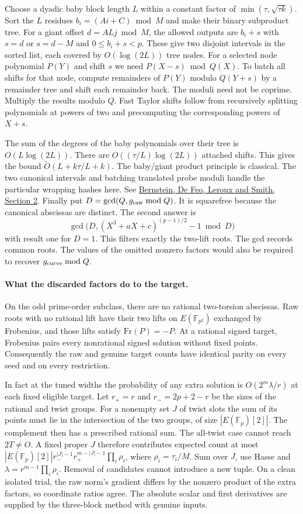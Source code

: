 \documentclass[11pt]{article}
\newcommand{\F}{\mathbb F}
\newcommand{\wtO}{\widetilde O}
\begin{document}
Choose a dyadic baby block length $L$ within a constant factor of
$\min(\tau,\sqrt{\tau k})$. Sort the $L$ residues
$b_i=(Ai+C)\bmod M$ and make their binary subproduct tree. For a
giant offset $d=ALj\bmod M$, the allowed outputs are $b_i+s$
with $s=d$ or $s=d-M$ and $0\le b_i+s<p$. These give two disjoint
intervals in the sorted list, each covered by $O(\log(2L))$ tree
nodes. For a selected node polynomial $P(Y)$ and shift $s$ we need
$P(X-s)\bmod Q(X)$. To batch all shifts for that node, compute
remainders of $P(Y)$ modulo $Q(Y+s)$ by a remainder tree and shift
each remainder back. The moduli need not be coprime. Multiply the
results modulo $Q$. Fast Taylor shifts follow from recursively
splitting polynomials at powers of two and precomputing the
corresponding powers of $X+s$.

The sum of the degrees of the baby polynomials over their tree is
$O(L\log(2L))$. There are $O((\tau/L)\log(2L))$ attached shifts.
This gives the bound $\wtO(L+k\tau/L+k)$. The baby/giant product
principle is classical. The two canonical intervals and batching
translated probe moduli handle the particular wrapping hashes here.
See \href{https://velusqrt.isogeny.org/velusqrt-20200616.pdf}
{Bernstein, De Feo, Leroux and Smith, Section 2}.
Finally put $D=\gcd(Q,g_{\rm raw}\bmod Q)$. It is squarefree
because the canonical abscissas are distinct. The second answer is
\[
  \gcd\big(D,(X^3+aX+c)^{(p-1)/2}-1\bmod D\big)
\]
with result one for $D=1$. This filters exactly the two-lift roots.
The gcd records common roots. The values of the omitted nonzero
factors would also be required to recover $g_{\rm curve}\bmod Q$.

\paragraph{What the discarded factors do to the target.}
On the odd prime-order subclass, there are no rational two-torsion
abscissas. Raw roots with no rational lift have their two lifts on
$E(\F_{p^2})$ exchanged by Frobenius, and those lifts satisfy
$\mathrm{Fr}(P)=-P$. At a rational signed target, Frobenius pairs
every nonrational signed solution without fixed points.
Consequently the raw and genuine target counts have identical
parity on every seed and on every restriction.

In fact at the tuned widths the probability of any extra solution
is $O(2^m\lambda/r)$ at each fixed eligible target.
Let $r_+=r$ and $r_-=2p+2-r$ be the sizes of the rational and
twist groups. For a nonempty set $J$ of twist slots the sum of its
points must lie in the intersection of the two groups, of size
$|E(\F_p)[2]|$. The complement then has a prescribed rational sum.
The all-twist case cannot reach $2T\ne O$. A fixed proper $J$
therefore contributes expected count at most
$|E(\F_p)[2]|r_-^{|J|-1}r_+^{m-|J|-1}\prod_i\rho_i$, where
$\rho_i=\tau_i/M$. Sum over $J$, use Hasse and
$\lambda=r^{m-1}\prod_i\rho_i$. Removal of candidates cannot
introduce a new tuple. On a clean isolated trial, the raw norm's
gradient differs by the nonzero product of the extra factors, so
coordinate ratios agree. The absolute scalar and first derivatives
are supplied by the three-block method with genuine inputs.
\end{document}
